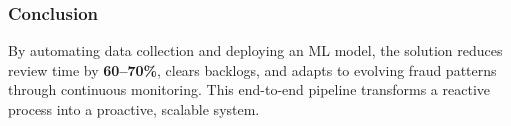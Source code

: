 \documentclass[
]{article}
\begin{document}
\subsubsection{\texorpdfstring{\textbf{Conclusion}}{Conclusion}}\label{conclusion}

By automating data collection and deploying an ML model, the solution
reduces review time by \textbf{60--70\%}, clears backlogs, and adapts to
evolving fraud patterns through continuous monitoring. This end-to-end
pipeline transforms a reactive process into a proactive, scalable
system.
\end{document}
